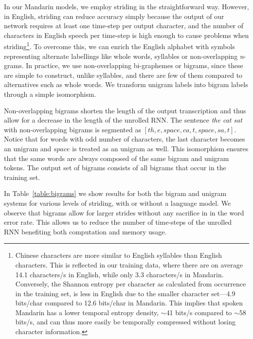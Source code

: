 \documentclass{article}
\begin{document}
In our Mandarin models, we employ striding in the straightforward way. However, in English, striding can reduce accuracy simply because the output of our network requires at least one time-step per output character, and the number of characters in English speech per time-step is high enough to cause problems when striding\footnote{Chinese characters are more similar to English syllables than English characters. This is reflected in our training data, where there are on average 14.1 characters/s in English, while only 3.3 characters/s in Mandarin. Conversely, the Shannon entropy per character as calculated from occurrence in the training set, is less in English due to the smaller character set---4.9 bits/char compared to 12.6 bits/char in Mandarin. This implies that spoken Mandarin has a lower temporal entropy density, $\sim$41 bits/s compared to $\sim$58 bits/s, and can thus more easily be temporally compressed without losing character information.}. To overcome this, we can enrich the English alphabet with symbols representing alternate labellings like whole words, syllables or non-overlapping \emph{n}-grams. In practice, we use non-overlapping bi-graphemes or bigrams, since these are simple to construct, unlike syllables, and there are few of them compared to alternatives such as whole words. We transform unigram labels into bigram labels through a simple isomorphism.

Non-overlapping bigrams shorten the length of the output transcription and thus allow for a decrease in the length of the unrolled RNN. The sentence \emph{the cat sat} with non-overlapping bigrams is segmented as $[th, e, space, ca, t, space, sa, t ]$. Notice that for words with odd number of characters, the last character becomes an unigram and $space$ is treated as an unigram as well. This isomorphism ensures that the same words are always composed of the same bigram and unigram tokens. The output set of bigrams consists of all bigrams that occur in the training set. 

In Table~\ref{table:bigrams} we show results for both the bigram and unigram systems for various levels of striding, with or without a language model. We observe that bigrams allow for larger strides without any sacrifice in in the word error rate. This allows us to reduce the number of time-steps of the unrolled RNN benefiting both computation and memory usage.
\end{document}
